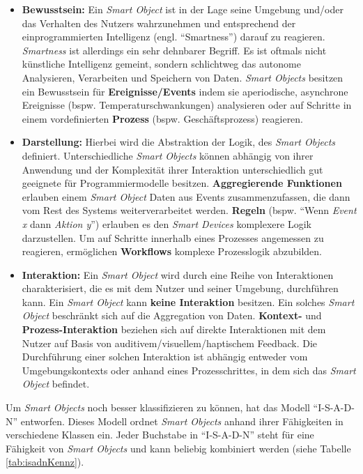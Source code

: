 \begin{itemize}
    \item \textbf{Bewusstsein:} Ein \textit{Smart Object} ist in der Lage seine Umgebung und/oder das Verhalten des Nutzers wahrzunehmen und entsprechend der einprogrammierten Intelligenz (engl. "`Smartness"') darauf zu reagieren. \textit{Smartness} ist allerdings ein sehr dehnbarer Begriff. Es ist oftmals nicht künstliche Intelligenz gemeint, sondern schlichtweg das autonome Analysieren, Verarbeiten und Speichern von Daten. \textit{Smart Objects} besitzen ein Bewusstsein für \textbf{Ereignisse/Events} indem sie aperiodische, asynchrone Ereignisse (bspw. Temperaturschwankungen) analysieren oder auf Schritte in einem vordefinierten \textbf{Prozess} (bspw. Geschäftsprozess) reagieren. 
    \item \textbf{Darstellung:} Hierbei wird die Abstraktion der Logik, des \textit{Smart Objects} definiert. Unterschiedliche \textit{Smart Objects} können abhängig von ihrer Anwendung und der Komplexität ihrer Interaktion unterschiedlich gut geeignete für Programmiermodelle besitzen. \textbf{Aggregierende Funktionen} erlauben einem \textit{Smart Object} Daten aus Events zusammenzufassen, die dann vom Rest des Systems weiterverarbeitet werden. \textbf{Regeln} (bspw. "`Wenn \textit{Event x} dann \textit{Aktion y}"') erlauben es den \textit{Smart Devices} komplexere Logik darzustellen. Um auf Schritte innerhalb eines Prozesses angemessen zu reagieren, ermöglichen \textbf{Workflows} komplexe Prozesslogik abzubilden.
    \item \textbf{Interaktion:} Ein \textit{Smart Object} wird durch eine Reihe von Interaktionen charakterisiert, die es mit dem Nutzer und seiner Umgebung, durchführen kann. Ein \textit{Smart Object} kann \textbf{keine Interaktion} besitzen. Ein solches \textit{Smart Object} beschränkt sich auf die Aggregation von Daten. \textbf{Kontext-} und \textbf{Prozess-Interaktion} beziehen sich auf direkte Interaktionen mit dem Nutzer auf Basis von auditivem/visuellem/haptischem Feedback. Die Durchführung einer solchen Interaktion ist abhängig entweder vom Umgebungskontexts oder anhand eines Prozesschrittes, in dem sich das \textit{Smart Object} befindet.
\end{itemize}
Um \textit{Smart Objects} noch besser klassifizieren zu können, hat \cite{lopez2011taxonomy} das Modell "`I-S-A-D-N"' entworfen. Dieses Modell ordnet \textit{Smart Objects} anhand ihrer Fähigkeiten in verschiedene Klassen ein. Jeder Buchstabe in "`I-S-A-D-N"' steht für eine Fähigkeit von \textit{Smart Objects}  und kann beliebig kombiniert werden (siehe Tabelle \ref{tab:isadnKennz}). 
